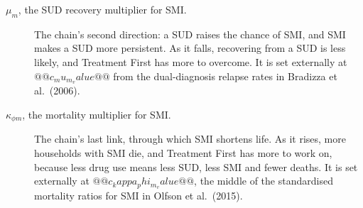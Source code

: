 \documentclass[10pt]{article}
\begin{document}
\begin{description}
\item[$\mu_m$, the SUD recovery multiplier for SMI.] The chain's second direction: a SUD raises the chance of SMI, and SMI makes a SUD more persistent. As it falls, recovering from a SUD is less likely, and Treatment First has more to overcome. It is set externally at $@@c_mu_m_value@@$ from the dual-diagnosis relapse rates in Bradizza et al.\ (2006).
\item[$\kappa_{\phi m}$, the mortality multiplier for SMI.] The chain's last link, through which SMI shortens life. As it rises, more households with SMI die, and Treatment First has more to work on, because less drug use means less SUD, less SMI and fewer deaths. It is set externally at $@@c_kappa_phi_m_value@@$, the middle of the standardised mortality ratios for SMI in Olfson et al.\ (2015).
\end{description}
\end{document}
